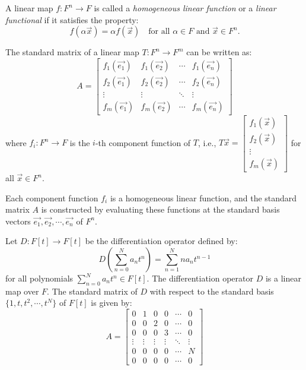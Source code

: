 \documentclass[
	11pt, %
	fleqn, %
	a4paper, %
]{LegrandOrangeBook}
\begin{document}
\begin{definition}
    A linear map $f: F^n \to F$ is called a \emph{homogeneous linear function} or a \emph{linear functional} if it satisfies the property:
    \[
        f(\alpha \vec{x}) = \alpha f(\vec{x}) \quad \text{for all } \alpha \in F \text{ and } \vec{x} \in F^n.
    \]
\end{definition}

\begin{corollary}
    The standard matrix of a linear map $T: F^n \to F^m$ can be written as:
    \[
        A = \begin{bmatrix}
            f_1(\vec{e_1}) & f_1(\vec{e_2}) & \cdots & f_1(\vec{e_n}) \\
            f_2(\vec{e_1}) & f_2(\vec{e_2}) & \cdots & f_2(\vec{e_n}) \\
            \vdots & \vdots & \ddots & \vdots \\
            f_m(\vec{e_1}) & f_m(\vec{e_2}) & \cdots & f_m(\vec{e_n})
        \end{bmatrix}
    \]
    where $f_i: F^n \to F$ is the $i$-th component function of $T$, i.e., $T\vec{x} = \begin{bmatrix}
        f_1(\vec{x}) \\
        f_2(\vec{x}) \\
        \vdots \\
        f_m(\vec{x})
    \end{bmatrix}$ for all $\vec{x} \in F^n$.
\end{corollary}

\begin{remark}
    Each component function $f_i$ is a homogeneous linear function, and the standard matrix $A$ is constructed by evaluating these functions at the standard basis vectors $\vec{e_1}, \vec{e_2}, \cdots, \vec{e_n}$ of $F^n$.
\end{remark}

\begin{example}
    Let $D: F[t] \to F[t]$ be the differentiation operator defined by:
    \[
        D\left( \sum_{n=0}^{N} a_n t^n \right) = \sum_{n=1}^{N} n a_n t^{n-1}
    \]
    for all polynomials $\sum_{n=0}^{N} a_n t^n \in F[t]$. The differentiation operator $D$ is a linear map over $F$. The standard matrix of $D$ with respect to the standard basis $\{1, t, t^2, \cdots, t^N\}$ of $F[t]$ is given by:
    \[
        A = \begin{bmatrix}
            0 & 1 & 0 & 0 & \cdots & 0 \\
            0 & 0 & 2 & 0 & \cdots & 0 \\
            0 & 0 & 0 & 3 & \cdots & 0 \\
            \vdots & \vdots & \vdots & \vdots & \ddots & \vdots \\
            0 & 0 & 0 & 0 & \cdots & N \\
            0 & 0 & 0 & 0 & \cdots & 0
        \end{bmatrix}
    \]
\end{example}
\end{document}
